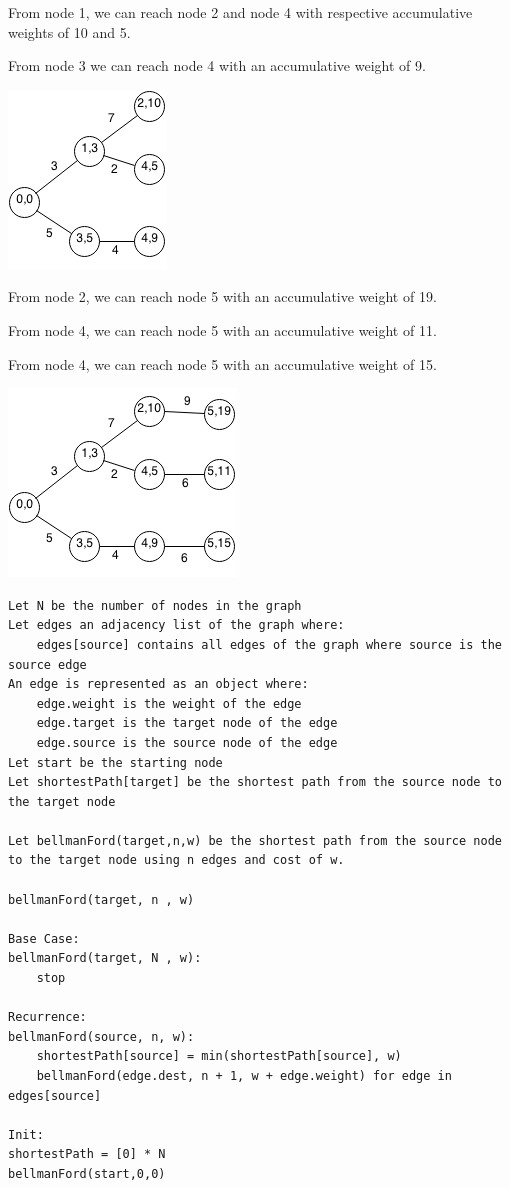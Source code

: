 \documentclass[11pt,oneside]{book}
\makeatletter
\def\maxwidth#1{\ifdim\Gin@nat@width>#1 #1\else\Gin@nat@width\fi}
\makeatother
\begin{document}
From node 1, we can reach node 2 and node 4 with respective accumulative weights of 10 and 5.

From node 3 we can reach node 4 with an accumulative weight of 9.

\vspace{5px}\includegraphics[width=\maxwidth{\textwidth}]{bellmanford4.png}

From node 2, we can reach node 5 with an accumulative weight of 19.

From node 4, we can reach node 5 with an accumulative weight of 11.

From node 4, we can reach node 5 with an accumulative weight of 15.

\vspace{5px}\includegraphics[width=\maxwidth{\textwidth}]{bellmanford5.png}

\begin{lstlisting}
Let N be the number of nodes in the graph
Let edges an adjacency list of the graph where:
    edges[source] contains all edges of the graph where source is the source edge
An edge is represented as an object where:
    edge.weight is the weight of the edge
    edge.target is the target node of the edge
    edge.source is the source node of the edge
Let start be the starting node
Let shortestPath[target] be the shortest path from the source node to the target node

Let bellmanFord(target,n,w) be the shortest path from the source node to the target node using n edges and cost of w.

bellmanFord(target, n , w)

Base Case:
bellmanFord(target, N , w):
    stop

Recurrence:
bellmanFord(source, n, w):
    shortestPath[source] = min(shortestPath[source], w)
    bellmanFord(edge.dest, n + 1, w + edge.weight) for edge in edges[source]

Init:
shortestPath = [0] * N
bellmanFord(start,0,0)
\end{lstlisting}
\end{document}
